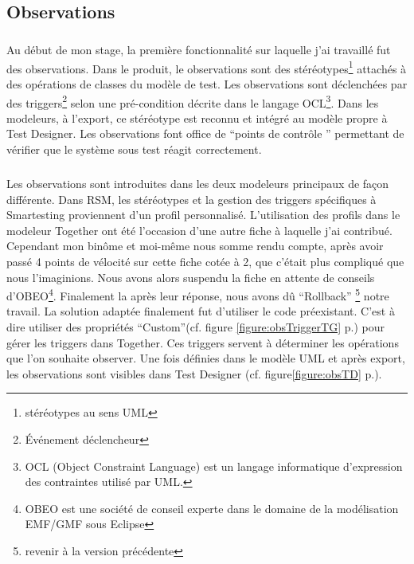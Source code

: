 \subsection{Observations}
\subparagraph*{}
Au début de mon stage, la première fonctionnalité sur laquelle j'ai travaillé fut des observations. Dans le produit, le observations sont des stéréotypes\footnote{stéréotypes au sens UML} attachés à des opérations de classes du modèle de test. Les observations sont déclenchées par des triggers\footnote{Événement déclencheur} selon une pré-condition décrite dans le langage OCL\footnote{OCL (Object Constraint Language) est un langage informatique d'expression des contraintes utilisé par UML.}. Dans les modeleurs, à l'export, ce stéréotype est reconnu et intégré au modèle propre à Test Designer. Les observations font office de ``points de contrôle '' permettant de vérifier que le système sous test réagit correctement.
\subparagraph*{}
Les observations sont introduites dans les deux modeleurs principaux de façon différente. Dans RSM, les stéréotypes et la gestion des triggers spécifiques à Smartesting proviennent d'un profil personnalisé. L'utilisation des profils dans le modeleur Together ont été l'occasion d'une autre fiche à laquelle j'ai contribué. Cependant mon binôme et moi-même nous somme rendu compte, après avoir passé 4 points de vélocité sur cette fiche cotée à 2, que c'était plus compliqué que nous l'imaginions. Nous avons alors suspendu la fiche en attente de conseils d'OBEO\footnote{OBEO est une société de conseil experte dans le domaine de la modélisation EMF/GMF sous Eclipse}. Finalement la après leur réponse, nous avons dû ``Rollback'' \footnote{revenir à la version précédente} notre travail. La solution adaptée finalement fut d'utiliser le code préexistant. C'est à dire utiliser des propriétés ``Custom''(cf. figure \ref{figure:obsTriggerTG} p.\pageref{figure:obsTriggerTG}) pour gérer les triggers dans Together. Ces triggers servent à déterminer les opérations que l'on souhaite observer. Une fois définies dans le modèle UML et après export, les observations sont visibles dans Test Designer (cf. figure\ref{figure:obsTD} p.\pageref{figure:obsTD}).
